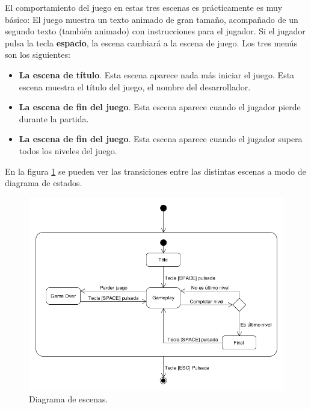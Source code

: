 El comportamiento del juego en estas tres escenas es prácticamente es muy básico: El juego muestra un texto animado de gran tamaño, acompañado de un segundo texto (también animado) con instrucciones para el jugador. Si el jugador pulsa la tecla \textbf{espacio}, la escena cambiará a la escena de juego. Los tres menús son los siguientes:
\begin{itemize}
\item \textbf{La escena de título}. Esta escena aparece nada más iniciar el juego. Esta escena muestra el título del juego, el nombre del desarrollador.
\item \textbf{La escena de fin del juego}. Esta escena aparece cuando el jugador pierde durante la partida.
\item \textbf{La escena de fin del juego}. Esta escena aparece cuando el jugador supera todos los niveles del juego.
\end{itemize}
En la figura \ref{diagrama_escenas} se pueden ver las transiciones entre las distintas escenas a modo de diagrama de estados.
\begin{figure}[!t]
    \centering
    \includegraphics[width=1\textwidth]{images/estructura/menu/scenes}
    \caption{Diagrama de escenas.}
    \label{diagrama_escenas}
\end{figure}

